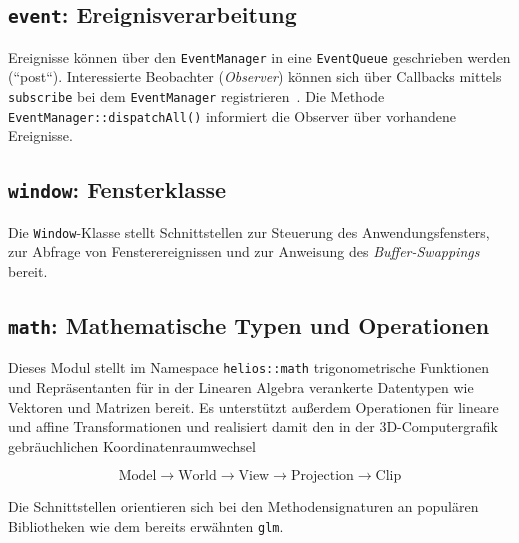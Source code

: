 \subsection*{\texttt{event}: Ereignisverarbeitung}
Ereignisse können über den \texttt{EventManager} in eine \texttt{EventQueue} geschrieben werden (``post``).
Interessierte Beobachter (\textit{Observer}) können sich über Callbacks mittels \texttt{subscribe} bei dem \texttt{EventManager} registrieren~\cite[293 ff.]{GHJV94}.
Die Methode \texttt{EventManager::dispatchAll()} informiert die Observer über vorhandene Ereignisse.

\subsection*{\texttt{window}: Fensterklasse}
Die \texttt{Window}-Klasse stellt Schnittstellen zur Steuerung des Anwendungsfensters, zur Abfrage von Fensterereignissen und zur Anweisung des \textit{Buffer-Swappings} bereit.


\subsection*{\texttt{math}: Mathematische Typen und Operationen}
Dieses Modul stellt im Namespace \texttt{helios::math} trigonometrische Funktionen und Repräsentanten für in der Linearen Algebra verankerte Datentypen wie Vektoren und Matrizen bereit.
Es unterstützt außerdem Operationen für lineare und affine Transformationen und realisiert damit den in der  3D-Computergrafik gebräuchlichen Koordinatenraumwechsel

\[
    \text{Model}\rightarrow\text{World}\rightarrow\text{View}\rightarrow\text{Projection}\rightarrow\text{Clip}
\]

\noindent

Die Schnittstellen orientieren sich bei den Methodensignaturen an populären Bibliotheken wie dem bereits erwähnten \texttt{glm}.

